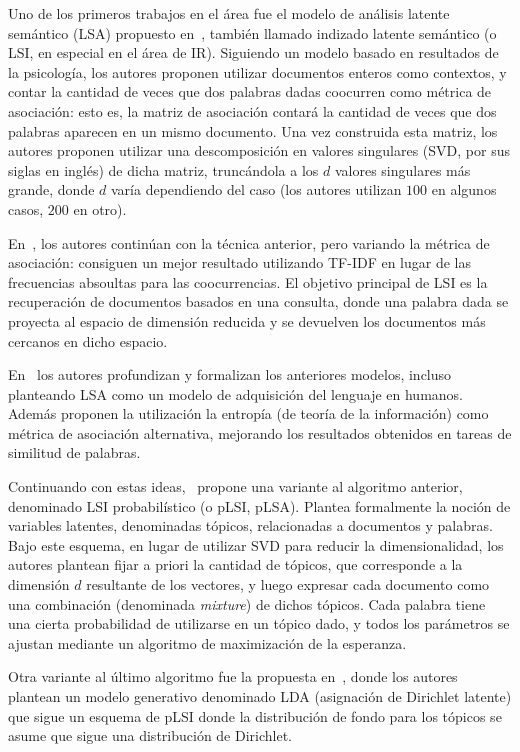 Uno de los primeros trabajos en el área fue el modelo de análisis latente semántico (LSA) propuesto
en~\cite{Dumais1988}, también llamado indizado latente semántico (o LSI, en especial en el área de
IR). Siguiendo un modelo basado en resultados de la psicología, los autores proponen utilizar
documentos enteros como contextos, y contar la cantidad de veces que dos palabras dadas coocurren
como métrica de asociación: esto es, la matriz de asociación contará la cantidad de veces que dos
palabras aparecen en un mismo documento. Una vez construida esta matriz, los autores proponen
utilizar una descomposición en valores singulares (SVD, por sus siglas en inglés) de dicha matriz,
truncándola a los $d$ valores singulares más grande, donde $d$ varía dependiendo del caso (los
autores utilizan $100$ en algunos casos, $200$ en otro).

En~\cite{Deerwester1990}, los autores continúan con la técnica anterior, pero variando la métrica de
asociación: consiguen un mejor resultado utilizando TF-IDF en lugar de las frecuencias absoultas
para las coocurrencias. El objetivo principal de LSI es la recuperación de documentos basados en una
consulta, donde una palabra dada se proyecta al espacio de dimensión reducida y se devuelven los
documentos más cercanos en dicho espacio.

En~\cite{LandauerDumais1997} los autores profundizan y formalizan los anteriores modelos, incluso
planteando LSA como un modelo de adquisición del lenguaje en humanos. Además proponen la utilización
la entropía (de teoría de la información) como métrica de asociación alternativa, mejorando los
resultados obtenidos en tareas de similitud de palabras.

Continuando con estas ideas,~\cite{Hoffman1999} propone una variante al algoritmo anterior,
denominado LSI probabilístico (o pLSI, pLSA). Plantea formalmente la noción de variables latentes,
denominadas tópicos, relacionadas a documentos y palabras. Bajo este esquema, en lugar de utilizar
SVD para reducir la dimensionalidad, los autores plantean fijar a priori la cantidad de tópicos, que
corresponde a la dimensión $d$ resultante de los vectores, y luego expresar cada documento como una
combinación (denominada \textit{mixture}) de dichos tópicos. Cada palabra tiene una cierta
probabilidad de utilizarse en un tópico dado, y todos los parámetros se ajustan mediante un
algoritmo de maximización de la esperanza.

Otra variante al último algoritmo fue la propuesta en~\cite{Blei2003}, donde los autores plantean un
modelo generativo denominado LDA (asignación de Dirichlet latente) que sigue un esquema de pLSI
donde la distribución de fondo para los tópicos se asume que sigue una distribución de Dirichlet.


